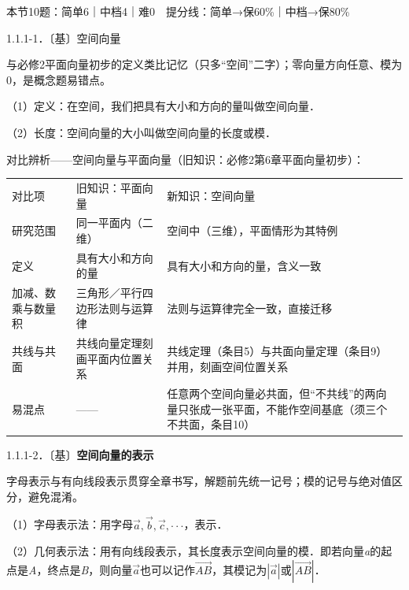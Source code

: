 

本节10题：简单6｜中档4｜难0　提分线：简单→保60\%｜中档→保80\%


1.1.1-1．〔基〕空间向量

与必修2平面向量初步的定义类比记忆（只多``空间''二字）；零向量方向任意、模为0，是概念题易错点。

（1）定义：在空间，我们把具有大小和方向的量叫做空间向量．

（2）长度：空间向量的大小叫做空间向量的长度或模．

对比辨析------空间向量与平面向量（旧知识：必修2第6章平面向量初步）：

\begin{table}[!t]\centering\begin{tabular}{@{}
  >{\raggedright\arraybackslash}p{}
  >{\raggedright\arraybackslash}p{}
  >{\raggedright\arraybackslash}p{}@{}}
\toprule
对比项 & 旧知识：平面向量 & 新知识：空间向量 \\
研究范围 & 同一平面内（二维） & 空间中（三维），平面情形为其特例 \\
定义 & 具有大小和方向的量 & 具有大小和方向的量，含义一致 \\
加减、数乘与数量积 & 三角形／平行四边形法则与运算律 &
法则与运算律完全一致，直接迁移 \\
共线与共面 & 共线向量定理刻画平面内位置关系 &
共线定理（条目5）与共面向量定理（条目9）并用，刻画空间位置关系 \\
易混点 & ------ &
任意两个空间向量必共面，但``不共线''的两向量只张成一张平面，不能作空间基底（须三个不共面，条目10） \\
\bottomrule
\end{tabular}\end{table}

1.1.1-2．〔基〕\textbf{空间向量的表示}

字母表示与有向线段表示贯穿全章书写，解题前先统一记号；模的记号与绝对值区分，避免混淆。

（1）字母表示法：用字母\(\overrightarrow{a},\overrightarrow{b},\overrightarrow{c}, \cdot \cdot \cdot\)，表示．

（2）几何表示法：用有向线段表示，其长度表示空间向量的模．即若向量\emph{a}的起点是\emph{A}，终点是\emph{B}，则向量\(\overrightarrow{a}\)也可以记作\(\overrightarrow{AB}\)，其模记为\(\left| \overrightarrow{a} \right|\)或\(\left| \overrightarrow{AB} \right|\)．

